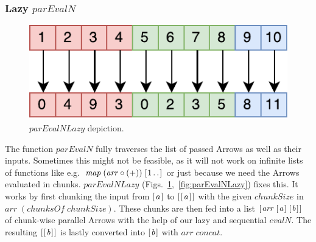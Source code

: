 \documentclass{jfp1}
\newcommand{\Varid}[1]{\mathit{#1}}
\DeclareRobustCommand{\hairspn}{\hspace{1pt}\nolinebreak}%
\DeclareRobustCommand{\eg}{{e.\hairspn{}g.~}}
\begin{document}
\subsubsection{Lazy \ensuremath{\Varid{parEvalN}}}
\begin{figure}[tb]
	\includegraphics[scale=0.7]{images/parEvalNLazy}
	\caption{\ensuremath{\Varid{parEvalNLazy}} depiction.}
	\label{fig:parEvalNLazyImg}
\end{figure}
The function \ensuremath{\Varid{parEvalN}} fully traverses the list of passed Arrows as well as their inputs. Sometimes this might not be feasible, as it will not work on infinite lists of functions like \eg \ensuremath{\Varid{map}\;(\Varid{arr}\mathbin{\circ}(\mathbin{+}))\;[\mskip1.5mu \mathrm{1}\mathinner{\ldotp\ldotp}\mskip1.5mu]} or just because we need the Arrows evaluated in chunks. \ensuremath{\Varid{parEvalNLazy}} (Figs.~\ref{fig:parEvalNLazyImg},~\ref{fig:parEvalNLazy}) fixes this. It works by first chunking the input from \ensuremath{[\mskip1.5mu \Varid{a}\mskip1.5mu]} to \ensuremath{[\mskip1.5mu [\mskip1.5mu \Varid{a}\mskip1.5mu]\mskip1.5mu]} with the given \ensuremath{\Varid{chunkSize}} in \ensuremath{\Varid{arr}\;(\Varid{chunksOf}\;\Varid{chunkSize})}. These chunks are then fed into a list \ensuremath{[\mskip1.5mu \Varid{arr}\;[\mskip1.5mu \Varid{a}\mskip1.5mu]\;[\mskip1.5mu \Varid{b}\mskip1.5mu]\mskip1.5mu]} of chunk-wise parallel Arrows with the help of our lazy and sequential \ensuremath{\Varid{evalN}}. The resulting \ensuremath{[\mskip1.5mu [\mskip1.5mu \Varid{b}\mskip1.5mu]\mskip1.5mu]} is lastly converted into \ensuremath{[\mskip1.5mu \Varid{b}\mskip1.5mu]} with \ensuremath{\Varid{arr}\;\Varid{concat}}.
\end{document}
